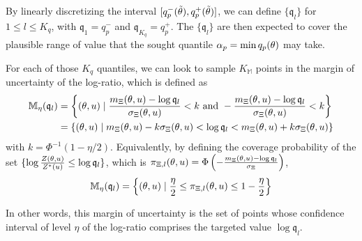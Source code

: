 \documentclass[../../Main_ManuscritThese.tex]{subfiles}
\begin{document}
By linearly discretizing the interval
$\interval{q^-_p(\tilde{\kk})}{q^+_p(\tilde{\kk})}$, we can define
$\{\mathfrak{q}_l\}$ for $1 \leq l \leq K_q$, with
$\mathfrak{q}_1 = q^-_p$ and $\mathfrak{q}_{K_q} = q^+_p$. The
$\{\mathfrak{q}_l\}$ are then expected to cover the plausible range of
value that the sought quantile $\alpha_p = \min q_p(\theta)$ may
take. %

For each of those $K_q$ quantiles, we can look to sample
$K_{\mathbb{M}}$ points in the margin of uncertainty of the log-ratio,
which is defined as
\begin{align}
  \mathbb{M}_{\eta}(\mathfrak{q}_l)  &= \left\{ (\theta, u) \mid \frac{m_{\Xi}(\theta, u) - \log \mathfrak{q}_l}{\sigma_{\Xi}(\theta, u)}< k \text{ and } -\frac{m_{\Xi}(\theta, u)-\log \mathfrak{q}_l}{\sigma_\Xi(\theta, u)}  <  k\right\} \\
                                     &= \{(\theta, u) \mid m_{\Xi}(\theta,u) - k\sigma_{\Xi}(\theta, u) < \log \mathfrak{q}_l < m_{\Xi}(\theta, u) + k\sigma_{\Xi}(\theta, u)\}
\end{align}
with $k = \Phi^{-1}(1-\eta/2)$. Equivalently, by defining the coverage
probability of the set
$\{\log \frac{Z(\theta,u)}{Z^*(u)}\leq \log \mathfrak{q}_l\}$, which
is
$\pi_{\Xi,l}(\theta, u) = \Phi\left(-\frac{m_{\Xi}(\theta, u) - \log
    \mathfrak{q}_l}{\sigma_{\Xi}}\right)$,
\begin{equation}
  \mathbb{M}_{\eta}(\mathfrak{q}_l) = \left\{(\theta, u) \mid \frac{\eta}{2}\leq\pi_{\Xi,l}(\theta, u) \leq 1-\frac{\eta}{2}\right\}
\end{equation}

In other words, this margin of uncertainty is the set of points whose
confidence interval of level $\eta$ of the log-ratio comprises the
targeted value $\log \mathfrak{q}_l$.
\end{document}
